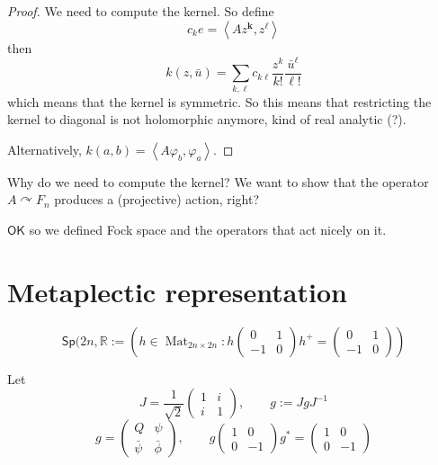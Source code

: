 \begin{proof}\leavevmode
	We need to compute the kernel. So define
	\[c_ke=\left<Az^{\mathbf{k}},z^\ell\right> \]
	then
	\[k(z,\bar{u} )=\sum_{k,\ell}c_{k\ell}\frac{z^k}{k!}\frac{\bar{u} ^\ell}{\ell!}\]
	which means that the kernel is symmetric. So this means that restricting the kernel to diagonal is not holomorphic anymore, kind of real analytic (?).

	Alternatively, $k(a,b)=\left<A\varphi_b,\varphi_a\right> $.
\end{proof}

\begin{question}[Dani]\leavevmode
	Why do we need to compute the kernel? We want to show that the operator $A\curvearrowright F_n$ produces a (projective) action, right?
\end{question}

\begin{thing7}{$\mathsf{OK}$}\leavevmode
	so we defined Fock space and the operators that act nicely on it.
\end{thing7}


\section{Metaplectic representation}

\begin{defn}\leavevmode
	\[\mathsf{Sp}(2n,\mathbb{R}:=\left( h\in\operatorname{Mat}_{2n\times 2n}:h \begin{pmatrix} 0&1\\-1&0 \end{pmatrix}h^+=\begin{pmatrix} 0&1\\-1&0 \end{pmatrix}   \right) \]
\end{defn}

Let
\[J=\frac{1}{\sqrt{2} }\begin{pmatrix} 1&i\\i&1 \end{pmatrix} , \qquad g:=Jg J^{-1}\]\[g=\begin{pmatrix} Q&\psi\\\bar{\psi} &\bar{\phi}  \end{pmatrix} ,\qquad g \begin{pmatrix} 1&0\\0&-1 \end{pmatrix} g^* =\begin{pmatrix} 1&0\\0&-1 \end{pmatrix} \]

